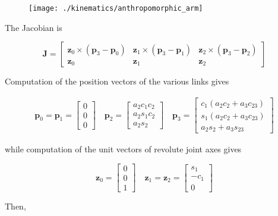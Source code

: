 \documentclass[10pt]{article}
\begin{document}
\begin{figure}[H]
    \centering
   \texttt{[image: ./kinematics/anthropomorphic\_arm]}
\end{figure}


The Jacobian is

$$
\boldsymbol{J}=\left[\begin{array}{ccc}
\boldsymbol{z}_{0} \times\left(\boldsymbol{p}_{3}-\boldsymbol{p}_{0}\right) & \boldsymbol{z}_{1} \times\left(\boldsymbol{p}_{3}-\boldsymbol{p}_{1}\right) & \boldsymbol{z}_{2} \times\left(\boldsymbol{p}_{3}-\boldsymbol{p}_{2}\right) \\
\boldsymbol{z}_{0} & \boldsymbol{z}_{1} & \boldsymbol{z}_{2}
\end{array}\right]
$$

Computation of the position vectors of the various links gives

$$
\begin{gathered}
\boldsymbol{p}_{0}=\boldsymbol{p}_{1}=\left[\begin{array}{l}
0 \\
0 \\
0
\end{array}\right] \quad \boldsymbol{p}_{2}=\left[\begin{array}{c}
a_{2} c_{1} c_{2} \\
a_{2} s_{1} c_{2} \\
a_{2} s_{2}
\end{array}\right] \quad
\boldsymbol{p}_{3}=\left[\begin{array}{c}
c_{1}\left(a_{2} c_{2}+a_{3} c_{23}\right) \\
s_{1}\left(a_{2} c_{2}+a_{3} c_{23}\right) \\
a_{2} s_{2}+a_{3} s_{23}
\end{array}\right]
\end{gathered}
$$

while computation of the unit vectors of revolute joint axes gives

$$
\boldsymbol{z}_{0}=\left[\begin{array}{l}
0 \\
0 \\
1
\end{array}\right] \quad \boldsymbol{z}_{1}=\boldsymbol{z}_{2}=\left[\begin{array}{c}
s_{1} \\
-c_{1} \\
0
\end{array}\right]
$$

Then,
\end{document}
